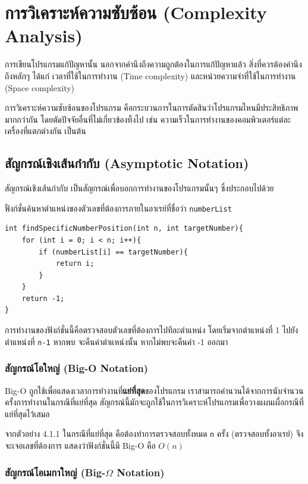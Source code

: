 \chapter{การวิเคราะห์ความซับซ้อน (Complexity Analysis)}

การเขียนโปรแกรมแก้ปัญหานั้น นอกจากคำนึงถึงความถูกต้องในการแก้ปัญหาแล้ว สิ่งที่ควรต้องคำนึงถึงหลักๆ ได้แก่ เวลาที่ใช้ในการทำงาน (Time complexity) และหน่วยความจำที่ใช้ในการทำงาน (Space complexity)

การวิเคราะห์ความซับซ้อนของโปรแกรม คือกระบวนการในการตัดสินว่าโปรแกรมไหนมีประสิทธิภาพมากกว่ากัน โดยตัดปัจจัยอื่นที่ไม่เกี่ยวข้องทิ้งไป เช่น ความเร็วในการทำงานของคอมพิวเตอร์แต่ละเครื่องที่แตกต่างกัน เป็นต้น

\section{สัญกรณ์เชิงเส้นกำกับ (Asymptotic Notation)}

สัญกรณ์เชิงเส้นกำกับ เป็นสัญกรณ์เพื่อบอกการทำงานของโปรแกรมนั้นๆ ซึ่งประกอบไปด้วย

\begin{example}
ฟั่งก์ชั่นค้นหาตำแหน่งของตัวเลขที่ต้องการภายในอาเรย์ที่ชื่อว่า \texttt{numberList}
\begin{lstlisting}
int findSpecificNumberPosition(int n, int targetNumber){
	for (int i = 0; i < n; i++){
		if (numberList[i] == targetNumber){
			return i;
		}
	}
	return -1;
}
\end{lstlisting}
การทำงานของฟังก์ชั่นนี้คือตรวจสอบตัวเลขที่ต้องการไปทีละตำแหน่ง โดยเริ่มจากตำแหน่งที่ 1 ไปยังตำแหน่งที่ \texttt{n-1} หากพบ จะคืนค่าตำแหน่งนั้น หากไม่พบจะคืนค่า -1 ออกมา
\end{example}

\subsection{สัญกรณ์โอใหญ่ (Big-O Notation)}

Big-O ถูกใช้เพื่อแสดงเวลาการทำงานที่\textbf{แย่ที่สุด}ของโปรแกรม เราสามารถคำนวนได้จากการนับจำนวนครั้งการทำงานในกรณีที่แย่ที่สุด สัญกรณ์นี้มักจะถูกใช้ในการวิเคราะห์โปรแกรมเพื่อวางแผนเผื่อกรณีที่แย่ที่สุดไว้เสมอ

จากตัวอย่าง 4.1.1 ในกรณีที่แย่ที่สุด คือต้องทำการตรวจสอบทั้งหมด \texttt{n} ครั้ง (ตรวจสอบทั้งอาเรย์) จึงจะเจอเลขที่ต้องการ แสดงว่าฟังก์ชั่นนี้มี Big-O คือ $O(n)$

\subsection{สัญกรณ์โอเมกาใหญ่ (Big-$\Omega$ Notation)}

